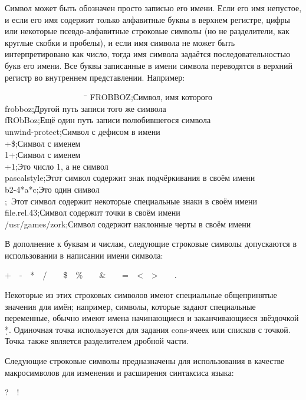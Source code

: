 Символ может быть обозначен просто записью его имени.
Если его имя непустое, и если его имя содержит только алфавитные буквы в верхнем
регистре, цифры или некоторые псевдо-алфавитные строковые символы (но не
разделители, как круглые скобки и пробелы), и если имя символа не может быть
интерпретировано как число, тогда имя символа задаётся последовательностью букв
его имени.
Все буквы записанные в имени символа переводятся в верхний регистр во внутреннем
представлении.
Например:
\begin{lisp}
~~~~~~~~~~~~~~~~~~~~\=\kill
FROBBOZ\>;\textrm{Символ, имя которого } \\
frobboz\>;\textrm{Другой путь записи того же символа} \\
fRObBoz\>;\textrm{Ещё один путь записи полюбившегося символа} \\
unwind-protect\>;\textrm{Символ с дефисом в имени} \\
+\$\>;\textrm{Символ с именем \cd{+\$}} \\
1+\>;\textrm{Символ с именем } \\
+1\>;\textrm{Это число 1, а не символ} \\
pascal{\Xunderscore}style\>;\textrm{Этот символ содержит знак подчёркивания в своём
  имени} \\
b{\Xcircumflex}2-4*a*c\>;\textrm{Это один символ} \\
\>;~\textrm{Этот символ содержит некоторые специальные знаки в своём имени} \\
file.rel.43\>;\textrm{Символ содержит точки в своём имени} \\
/usr/games/zork\>;\textrm{Символ содержит наклонные черты в своём имени}
\end{lisp}

В дополнение к буквам и числам, следующие строковые символы допускаются в
использовании в написании имени символа:
\begin{lisp}
+~~-~~*~~/~~{\Xatsign}~~\$~~\%~~{\Xcircumflex}~~\&~~{\Xunderscore}~~=~~<~~>~~{\Xtilde}~~.
\end{lisp}

Некоторые из этих строковых символов имеют специальные общепринятые значения
для имён;
например, символы, которые задают специальные переменные, обычно имеют имена
начинающиеся и заканчивающиеся звёздочкой \d{*}.
Одиночная точка используется для задания cons-ячеек или списков с точкой. Точка
также является разделителем дробной части.

Следующие строковые символы предназначены для использования в качестве
макросимволов для изменения и расширения синтаксиса языка:
\begin{lisp}
?~~!~~{\Xlbracket}~~{\Xrbracket}~~{\Xlbrace}~~{\Xrbrace}
\end{lisp}

